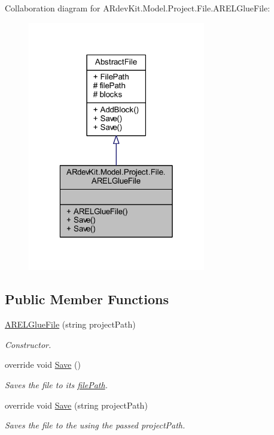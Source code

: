 Collaboration diagram for A\-Rdev\-Kit.\-Model.\-Project.\-File.\-A\-R\-E\-L\-Glue\-File\-:
\nopagebreak
\begin{figure}[H]
\begin{center}
\leavevmode
\includegraphics[width=220pt]{class_a_rdev_kit_1_1_model_1_1_project_1_1_file_1_1_a_r_e_l_glue_file__coll__graph}
\end{center}
\end{figure}
\subsection*{Public Member Functions}
\begin{DoxyCompactItemize}
\item 
\hyperlink{class_a_rdev_kit_1_1_model_1_1_project_1_1_file_1_1_a_r_e_l_glue_file_a944e3a92b64f3988dbd2e289fa3b2d36}{A\-R\-E\-L\-Glue\-File} (string project\-Path)
\begin{DoxyCompactList}\small\item\em Constructor. \end{DoxyCompactList}\item 
override void \hyperlink{class_a_rdev_kit_1_1_model_1_1_project_1_1_file_1_1_a_r_e_l_glue_file_af2a513e4dce9fe965fca00612335de10}{Save} ()
\begin{DoxyCompactList}\small\item\em Saves the file to its \hyperlink{class_a_rdev_kit_1_1_model_1_1_project_1_1_file_1_1_abstract_file_ad879e3a81860da8b72f2d9f61a18ab3b}{file\-Path}. \end{DoxyCompactList}\item 
override void \hyperlink{class_a_rdev_kit_1_1_model_1_1_project_1_1_file_1_1_a_r_e_l_glue_file_a82712a65053e760ba21b92fefe67baf3}{Save} (string project\-Path)
\begin{DoxyCompactList}\small\item\em Saves the file to the using the passed project\-Path. \end{DoxyCompactList}\end{DoxyCompactItemize}
